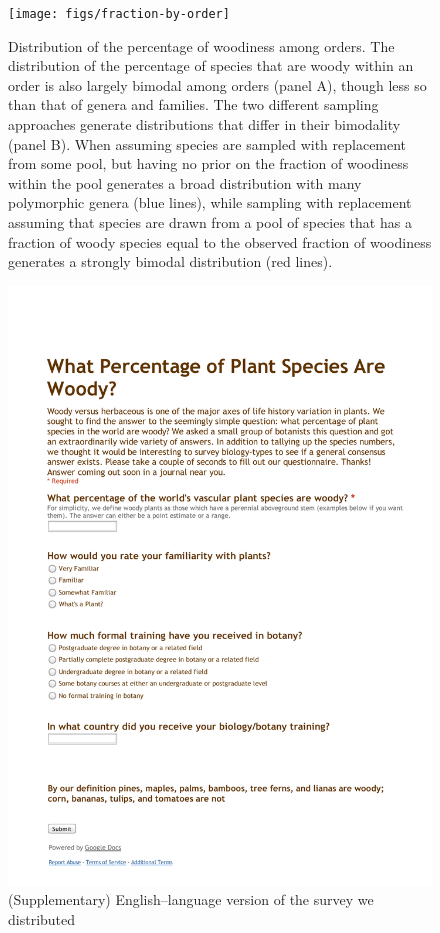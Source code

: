 \documentclass[a4paper,12pt]{article}
\begin{document}
\begin{figure}[p]
  \centering
  \texttt{[image: figs/fraction-by-order]}
  \caption{Distribution of the percentage of woodiness among orders.
    The distribution of the percentage of species that are woody within
    an order is also largely bimodal among orders (panel A), though
    less so than that of genera and families.
    The two different sampling approaches generate distributions that
    differ in their bimodality (panel B). When assuming species are
    sampled with replacement from some pool, but having no prior on
    the fraction of woodiness within the pool generates a broad
    distribution with many polymorphic genera (blue lines), while
    sampling with replacement assuming that species are drawn from a
    pool of species that has a fraction of woody species equal to the
    observed fraction of woodiness generates a strongly bimodal
    distribution (red lines).}
  \label{fig:distribution-order}
\end{figure}    

\begin{figure}[p]
  \centering
  \vspace{-20ex}
  \includegraphics[scale=0.7]{figs/Survey_supplemental}
  \caption{(Supplementary) English--language version of the survey we
    distributed}
  \label{fig:survey-text}
\end{figure}
\end{document}
